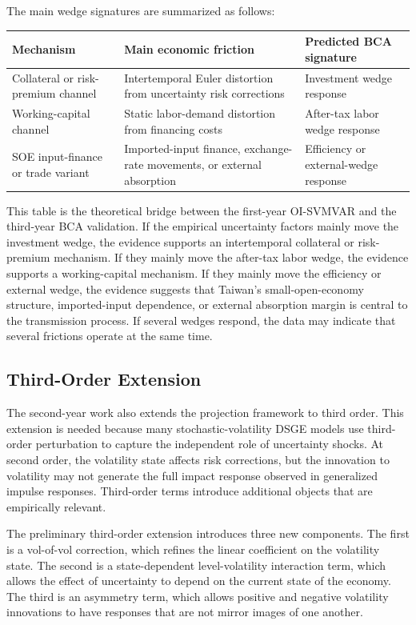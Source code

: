 \documentclass[12pt]{article}
\begin{document}
The main wedge signatures are summarized as follows:
\begin{center}
\begin{tabular}{p{}p{}p{}}
\toprule
Mechanism & Main economic friction & Predicted BCA signature \\
\midrule
Collateral or risk-premium channel &
Intertemporal Euler distortion from uncertainty risk corrections &
Investment wedge response \\
\addlinespace
Working-capital channel &
Static labor-demand distortion from financing costs &
After-tax labor wedge response \\
\addlinespace
SOE input-finance or trade variant &
Imported-input finance, exchange-rate movements, or external absorption &
Efficiency or external-wedge response \\
\bottomrule
\end{tabular}
\end{center}

This table is the theoretical bridge between the first-year OI-SVMVAR and the third-year BCA
validation. If the empirical uncertainty factors mainly move the investment wedge, the evidence
supports an intertemporal collateral or risk-premium mechanism. If they mainly move the
after-tax labor wedge, the evidence supports a working-capital mechanism. If they mainly move
the efficiency or external wedge, the evidence suggests that Taiwan's small-open-economy
structure, imported-input dependence, or external absorption margin is central to the transmission
process. If several wedges respond, the data may indicate that several frictions operate at the
same time.

\subsection{Third-Order Extension}

The second-year work also extends the projection framework to third order. This extension is
needed because many stochastic-volatility DSGE models use third-order perturbation to capture
the independent role of uncertainty shocks. At second order, the volatility state affects risk
corrections, but the innovation to volatility may not generate the full impact response observed
in generalized impulse responses. Third-order terms introduce additional
objects that are empirically relevant.

The preliminary third-order extension introduces three new components. The first is a
vol-of-vol correction, which refines the linear coefficient on the volatility state. The second is a
state-dependent level-volatility interaction term, which allows the effect of uncertainty to depend
on the current state of the economy. The third is an asymmetry term, which allows positive and
negative volatility innovations to have responses that are not mirror images of one another.
\end{document}
